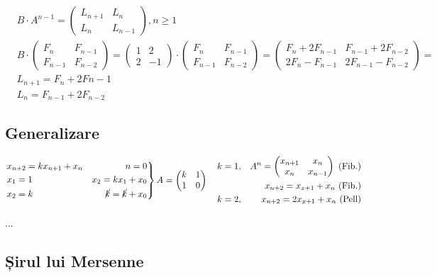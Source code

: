 \documentclass[12pt]{article}
\theoremstyle{definition}
\begin{document}
\[\begin{aligned}
&B \cdot A^{n-1} = \begin{pmatrix}
L_{n+1}&L_n\\
L_n&L_{n-1}
\end{pmatrix}, n \geq 1\\
&B\cdot\begin{pmatrix}
F_n&F_{n-1}\\
F_{n-1}&F_{n-2}
\end{pmatrix}= \begin{pmatrix}
1&2\\
2&-1
\end{pmatrix}\cdot\begin{pmatrix}
F_n&F_{n-1}\\
F_{n-1}&F_{n-2}
\end{pmatrix}=\begin{pmatrix}
F_{n}+2F_{n-1}&F_{n-1}+2F_{n-2}\\
2F_n-F_{n-1}&2F_{n-1}-F_{n-2}
\end{pmatrix}=\\
&L_{n+1}=F_{n}+2F{n-1}\\
&\boxed{L_n=F_{n-1}+2F_{n-2}}
\end{aligned}\]

\subsection*{Generalizare}
\[\left. \begin{aligned}
&x_{n+2} = k x_{n+1}+x_n & n=0\\
&x_1=1 & x_2=k x_1 + x_0\\
&x_2=k & \cancel{k} = \cancel{k} + x_0 
\end{aligned}\right\} A = \begin{pmatrix}
k&1\\
1&0
\end{pmatrix} \ \ \ \begin{aligned} &k=1, &A^n=\begin{pmatrix}
x_{n+1}&x_n\\
x_n&x_{n-1}
\end{pmatrix} \ \text{(Fib.)}\\
&&x_{n+2}=x_{x+1}+x_n \  \text{(Fib.)}\\
&k=2, &x_{n+2}=2x_{x+1}+x_n \ \text{(Pell)}
\end{aligned}\]

...

\subsection*{Șirul lui Mersenne}
\end{document}
